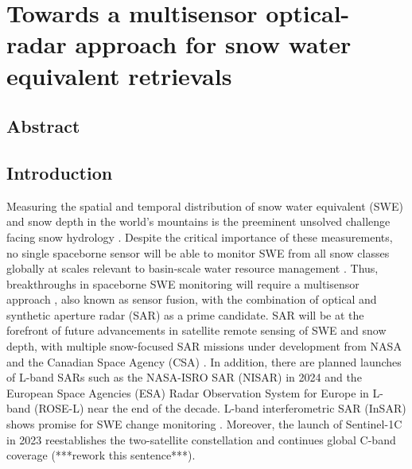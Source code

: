 \hypertarget{ch4}{%
\chapter{Towards a multisensor optical-radar approach for snow water equivalent retrievals}\label{ch4}}


\hypertarget{ch4-abstract}{\section{Abstract}\label{ch4-abstract}}


\hypertarget{ch4-intro}{\section{Introduction}\label{ch4-intro}}



Measuring the spatial and temporal distribution of snow water equivalent (SWE) and snow depth in the world’s mountains is the preeminent unsolved challenge facing snow hydrology \citep{dozierEstimatingSpatialDistribution2016}. Despite the critical importance of these measurements, no single spaceborne sensor will be able to monitor SWE from all snow classes \citep{sturmSeasonalSnowCover1995, sturmRevisitingGlobalSeasonal2021} globally at scales relevant to basin-scale water resource management \citep{lettenmaierInroadsRemoteSensing2015}. Thus, breakthroughs in spaceborne SWE monitoring will require a multisensor approach \citep{durandAchievingBreakthroughsGlobal2021}, also known as sensor fusion, with the combination of optical and synthetic aperture radar (SAR) as a prime candidate. SAR will be at the forefront of future advancements in satellite remote sensing of SWE and snow depth, with multiple snow-focused SAR missions under development from NASA and the Canadian Space Agency (CSA) \citep{tsangReviewArticleGlobal2022, yuehSatelliteSyntheticAperture2021, garnaudQuantifyingSnowMass2019}. In addition, there are planned launches of L-band SARs such as the NASA-ISRO SAR (NISAR) in 2024 and the European Space Agencies (ESA) Radar Observation System for Europe in L-band (ROSE-L) near the end of the decade. L-band interferometric SAR (InSAR) shows promise for SWE change monitoring \citep{tarriconeEstimatingSnowAccumulation2023a, marshallLBandInSARDepth2021, naglerAirborneExperimentInsar2022}. Moreover, the launch of Sentinel-1C in 2023 reestablishes the two-satellite constellation and continues global C-band coverage (***rework this sentence***). 

